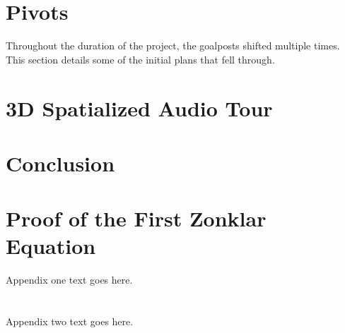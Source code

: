 \documentclass[a4paper, 10pt, american, titlepage]{article}
\begin{document}

\newpage

\section{Pivots}
\label{sec:pivots}

Throughout the duration of the project, the goalposts shifted multiple times.
This section details some of the initial plans that fell through.

\newpage

\section{3D Spatialized Audio Tour}
\label{sec:3dSpatializedAudioTour}

\newpage

\section{Conclusion}
\label{sec:conclusion}

\nocite{harvey2002} %

\newpage %

\printbibliography
{}

\newpage

\appendices
\section{Proof of the First Zonklar Equation}
Appendix one text goes here.

\section{}
Appendix two text goes here.
\end{document}
